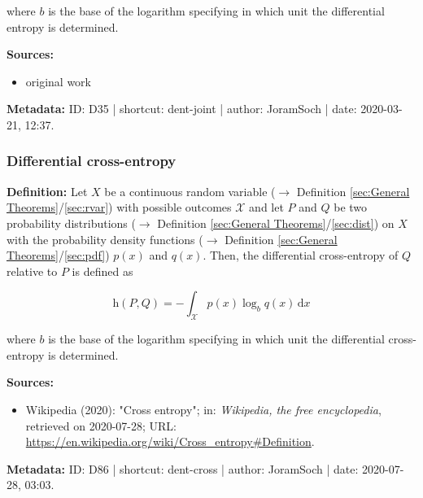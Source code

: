 \documentclass[a4paper,12pt,twoside]{book}
\begin{document}
where $b$ is the base of the logarithm specifying in which unit the differential entropy is determined.


\vspace{1em}
\textbf{Sources:}
\begin{itemize}
\item original work\end{itemize}


\vspace{1em}
\textbf{Metadata:} ID: D35 | shortcut: dent-joint | author: JoramSoch | date: 2020-03-21, 12:37.
\vspace{1em}



\subsubsection[\textit{Differential cross-entropy}]{Differential cross-entropy} \label{sec:dent-cross}
\setcounter{equation}{0}

\textbf{Definition:} Let $X$ be a continuous random variable ($\rightarrow$ Definition \ref{sec:General Theorems}/\ref{sec:rvar}) with possible outcomes $\mathcal{X}$ and let $P$ and $Q$ be two probability distributions ($\rightarrow$ Definition \ref{sec:General Theorems}/\ref{sec:dist}) on $X$ with the probability density functions ($\rightarrow$ Definition \ref{sec:General Theorems}/\ref{sec:pdf}) $p(x)$ and $q(x)$. Then, the differential cross-entropy of $Q$ relative to $P$ is defined as

\begin{equation} \label{eq:dent-cross-dent-cross}
\mathrm{h}(P,Q) = - \int_{\mathcal{X}} p(x) \log_b q(x) \, \mathrm{d}x
\end{equation}

where $b$ is the base of the logarithm specifying in which unit the differential cross-entropy is determined.


\vspace{1em}
\textbf{Sources:}
\begin{itemize}
\item Wikipedia (2020): "Cross entropy"; in: \textit{Wikipedia, the free encyclopedia}, retrieved on 2020-07-28; URL: \url{https://en.wikipedia.org/wiki/Cross_entropy#Definition}.
\end{itemize}


\vspace{1em}
\textbf{Metadata:} ID: D86 | shortcut: dent-cross | author: JoramSoch | date: 2020-07-28, 03:03.
\vspace{1em}
\end{document}
